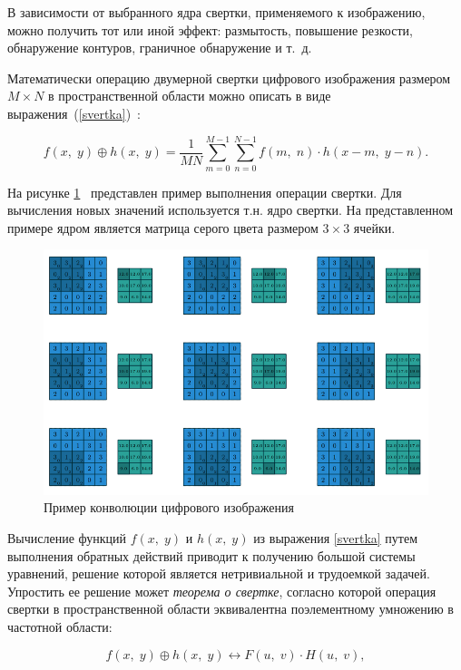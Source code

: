 В зависимости от выбранного ядра свертки, применяемого к изображению, можно получить тот или иной эффект: размытость, повышение резкости, обнаружение контуров, граничное обнаружение и т.~д.

Математически операцию двумерной свертки цифрового изображения размером $M \times N$ в пространственной области можно описать в виде выражения~(\ref{svertka})~\cite{svertka}: 

\begin{equation}\label{svertka}
	f(x,\;y) \oplus h(x,\;y) = \frac{1}{MN}\sum_{m=0}^{M-1}\sum_{n=0}^{N-1} f(m,\;n) \cdot h(x - m,\;y - n).
\end{equation}

На рисунке \ref{conv}~\cite{conv} представлен пример выполнения операции свертки. Для вычисления новых значений используется т.н. ядро свертки. На представленном примере ядром является матрица серого цвета размером $3\times3$ ячейки.

\begin{figure}[H]
	\centering
	\includegraphics[scale=1.5]{assets/convolution_example}
	\caption{Пример конволюции цифрового изображения}
	\label{conv}
\end{figure}

Вычисление функций $f(x,\;y)$ и $h(x,\;y)$ из выражения \ref{svertka} путем выполнения обратных действий приводит к получению большой системы уравнений, решение которой является нетривиальной и трудоемкой задачей. Упростить ее решение может \textit{теорема о свертке}, согласно которой операция свертки в пространственной области эквивалентна поэлементному умножению в частотной области:

\begin{equation}
	f(x,\;y) \oplus h(x,\;y) \longleftrightarrow F(u,\;v) \cdot H(u,\;v),
\end{equation}

